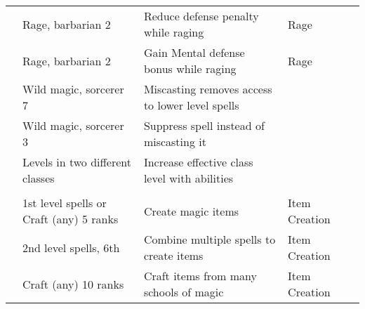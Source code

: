 \begin{longtabuwrapper}
\begin{longtabu}{>{\lcol}p{10em} >{\lcol}p{15em} >{\lcol}X >{\lcol}p{8em} >{\lcol}p{3em}}
                     & Rage, barbarian 2                 & Reduce defense penalty while raging & Rage &  \\
                  & Rage, barbarian 2                 & Gain Mental defense bonus while raging & Rage &  \\
             & Wild magic, sorcerer 7            & Miscasting removes access to lower level spells & \x &  \\
             & Wild magic, sorcerer 3            & Suppress spell instead of miscasting it & \x &  \\
                   & Levels in two different classes   & Increase effective class level with abilities & \x &  \\

        \midrule
         &  &  &  &  \\
         & 1st level spells or Craft (any) 5 ranks & Create magic items & Item Creation &  \\
         & 2nd level spells, 6th & Combine multiple spells to create items & Item Creation &  \\
         & Craft (any) 10 ranks & Craft items from many schools of magic & Item Creation &  \\


\end{longtabu}
\end{longtabuwrapper}
